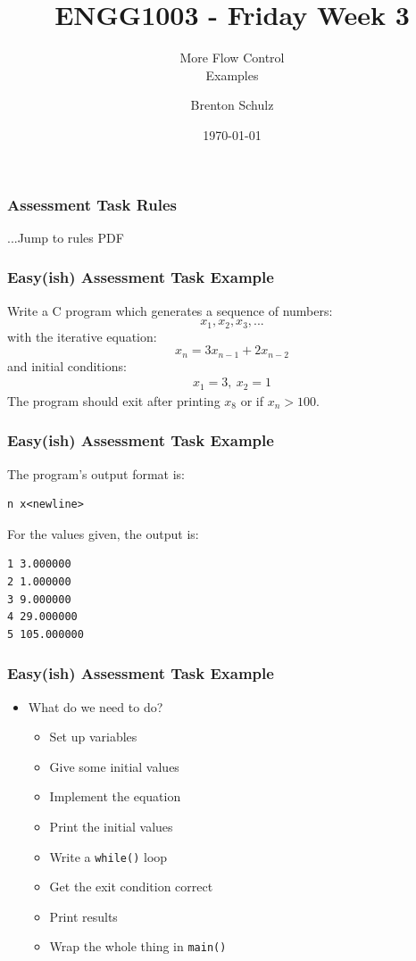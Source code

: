 \documentclass[14pt]{beamer}
\title{ENGG1003 - Friday Week 3}
\subtitle{More Flow Control\\Examples}
\author{Brenton Schulz}
\institute{University of Newcastle}
\date{\today}
\begin{document}
\titlepage


\begin{frame}
\frametitle{Assessment Task Rules}
\begin{center}
...Jump to rules PDF
\end{center}
\end{frame}

\begin{frame}
\frametitle{Easy(ish) Assessment Task Example}
{\small Write a C program which generates a sequence of numbers:
\begin{equation*}
x_1, x_2, x_3, ...
\end{equation*}
with the iterative equation:
\begin{equation*}
x_n = 3x_{n-1} + 2x_{n-2}
\end{equation*}
and initial conditions:
\begin{align*}
x_1 = 3,~ x_2 = 1
\end{align*}
The program should exit after printing $x_8$ or if $x_n > 100$.
}
\end{frame}

\begin{frame}[fragile]
\frametitle{Easy(ish) Assessment Task Example}
The program's output format is:
\begin{lstlisting}[style=pseudo]
n x<newline>
\end{lstlisting}
For the values given, the output is:
\begin{lstlisting}[style=pseudo]
1 3.000000
2 1.000000
3 9.000000
4 29.000000
5 105.000000
\end{lstlisting}
\end{frame}

\begin{frame}
\frametitle{Easy(ish) Assessment Task Example}
\begin{itemize}
\item What do we need to do?
	\begin{itemize}
		\item Set up variables
		\item Give some initial values
		\item Implement the equation
		\item Print the initial values
		\item Write a \texttt{while()} loop
		\item Get the exit condition correct
		\item Print results
		\item Wrap the whole thing in \texttt{main()}
	\end{itemize}
\end{itemize}
\end{frame}
\end{document}
